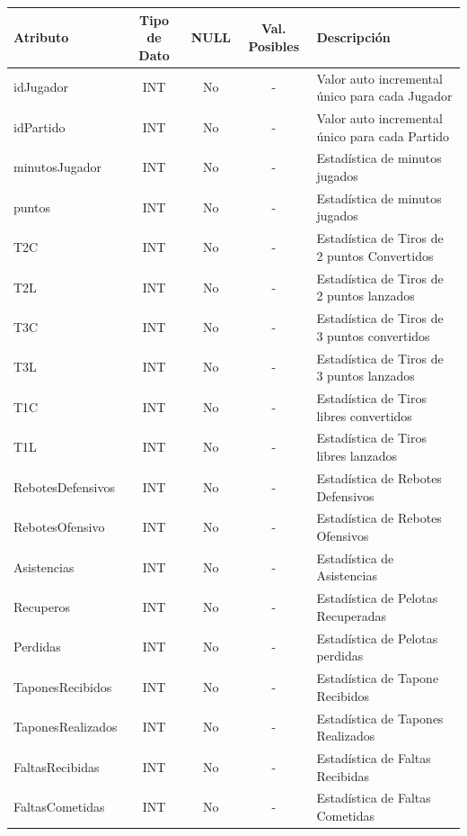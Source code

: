 \begin{table}[H]
	\centering
	\begin{tabularx}{\textwidth}{|l|c|c|c|X|} \hline
		\textbf{Atributo} & \textbf{Tipo de Dato} & \textbf{NULL} & \textbf{Val. Posibles} & \textbf{Descripción} \\ \hline
		idJugador  & INT & No & - & Valor auto incremental único para cada Jugador \\ \hline
		idPartido  & INT & No & - & Valor auto incremental único para cada Partido \\ \hline
		minutosJugador & INT & No & - & Estadística de minutos jugados\\ \hline
		puntos & INT & No & - & Estadística de minutos jugados\\ \hline
		T2C & INT & No & - & Estadística de Tiros de 2 puntos Convertidos\\ \hline
		T2L & INT & No & - & Estadística de Tiros de 2 puntos lanzados\\ \hline
		T3C & INT & No & - & Estadística de Tiros de 3 puntos convertidos\\ \hline
		T3L & INT & No & - & Estadística de Tiros de 3 puntos lanzados\\ \hline
		T1C & INT & No & - & Estadística de Tiros libres convertidos\\ \hline
		T1L & INT & No & - & Estadística de Tiros libres lanzados\\ \hline
		RebotesDefensivos & INT & No & - & Estadística de Rebotes Defensivos\\ \hline
		RebotesOfensivo & INT & No & - & Estadística de Rebotes Ofensivos\\ \hline
		Asistencias & INT & No & - & Estadística de Asistencias\\ \hline
		Recuperos & INT & No & - & Estadística de Pelotas Recuperadas\\ \hline
		Perdidas & INT & No & - & Estadística de Pelotas perdidas\\ \hline
		TaponesRecibidos & INT & No & - & Estadística de Tapone Recibidos\\ \hline
		TaponesRealizados & INT & No & - & Estadística de Tapones Realizados\\ \hline
		FaltasRecibidas & INT & No & - & Estadística de Faltas Recibidas\\ \hline
		FaltasCometidas & INT & No & - & Estadística de Faltas Cometidas\\ \hline
	\end{tabularx}
\end{table}


